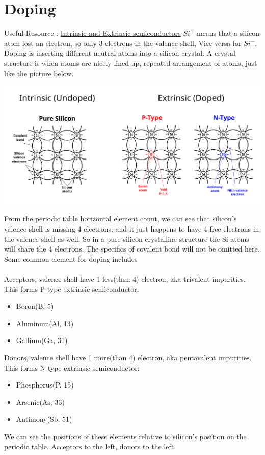 \documentclass{article}
\begin{document}
	\section{Doping}
		Useful Resource : \href{https://www.youtube.com/watch?v=ErcH_OuCaNY&list=PLfYdTiQCV_p7sDswtLZKK43BWOd2mTmHC&index=3&ab_channel=CircuitBread}{Intrinsic and Extrinsic semiconductors}
	 	$Si^+$ means that a silicon atom lost an electron, so only 3 electrons in the valence shell, Vice versa for $Si^{-}$.\\
	 	Doping is inserting different neutral atoms into a silicon crystal. A crystal structure is when atoms are nicely lined up, repeated arrangement of atoms, just like the picture below.
	 	\begin{center}
	 		\includegraphics[width=\textwidth]{img/si_doping.png}
	 	\end{center}
	 	From the periodic table horizontal element count, we can see that silicon's valence shell is missing 4 electrons, and it just happens to have 4 free electrons in the valence shell as well. So in a pure silicon crystalline structure the Si atoms will share the 4 electrons. The specifics of covalent bond will not be omitted here. Some common element for doping includes\\\\
	 	Acceptors, valence shell have 1 less(than 4) electron, aka trivalent impurities. This forms P-type extrinsic semiconductor:
	 	\begin{itemize}
	 		\item Boron(B, 5)
	 		\item Aluminum(Al, 13)
	 		\item Gallium(Ga, 31)
	 	\end{itemize}
	 	Donors, valence shell have 1 more(than 4) electron, aka pentavalent impurities. This forms N-type extrinsic semiconductor:
	 	\begin{itemize}
	 		\item Phosphorus(P, 15)
	 		\item Arsenic(As, 33)
	 		\item Antimony(Sb, 51)
	 	\end{itemize}
	 	We can see the positions of these elements relative to silicon's position on the periodic table. Acceptors to the left, donors to the left.
\end{document}
